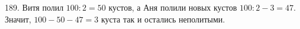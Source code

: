 189. Витя полил $100:2=50$ кустов, а Аня полили новых кустов $100:2-3=47.$ Значит, $100-50-47=3$ куста так и остались неполитыми.\\
